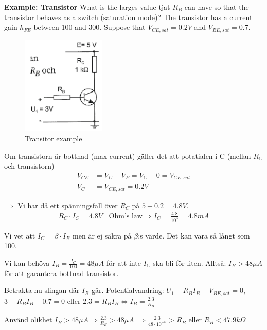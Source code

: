 \textbf{Example: Transistor}
What is the larges value tjat $R_B$ can have so that the transistor 
behaves as a switch (saturation mode)? The transistor has a current gain
$h_{FE}$ between 100 and 300. Suppose that $V_{CE,sat}=0.2V$ and
$V_{BE,sat}=0.7$.
\begin{figure}[h]
    \centering
    \includegraphics[width=4cm]{image/example-transistor.png}
    \caption{Transitor example}
\end{figure}

Om transistorn är bottnad (max current) gäller det att potatialen i C (mellan $R_C$
och transistorn)
\begin{align*}
    V_{CE} &= V_C - V_E = V_C - 0 = V_{CE,sat} \\
    V_C &= V_{CE,sat} = 0.2V
\end{align*}

$\Rightarrow$ Vi har då ett spänningsfall över $R_C$ på $5-0.2=4.8V$. \newline
\begin{align*}
    R_C\cdot I_C = 4.8V \;\; \text{ Ohm's law} \Rightarrow I_C = \frac{4.8}{10^3} = 4.8mA
\end{align*}

Vi vet att $I_C=\beta\cdot I_B$ men är ej säkra på $\beta$:s värde. Det kan vara så 
långt som 100. \newline

Vi kan behöva $I_B=\frac{I_C}{100}=48\mu A$ för att inte $I_C$ ska bli för liten.
Alltså: $I_B>48\mu A$ för att garantera bottnad transistor. \newline

Betrakta nu slingan där $I_B$ går. \newline
Potentialvandring: $U_1-R_BI_B-V_{BE,sat}= 0$, $3-R_BI_B-0.7=0$ \newline
eller $2.3=R_BI_B \Leftrightarrow I_B=\frac{2.3}{R_B}$ \newline

Använd olikhet $I_B>48\mu A \Rightarrow \frac{2.3}{R_B}>48\mu A$ $\Rightarrow \frac{2.3}{48\cdot10^{-6}}>R_B$ eller $R_B<47.9k\Omega$



